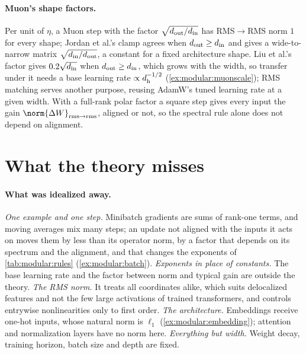\begin{refsection}
\paragraph{Muon's shape factors.} Per unit of $\eta$, a Muon step with the factor $\sqrt{d_{\mathrm{out}}/d_{\mathrm{in}}}$ has RMS$\to$RMS norm $1$ for every shape; Jordan et al.'s clamp agrees when $d_{\mathrm{out}}\ge d_{\mathrm{in}}$ and gives a wide-to-narrow matrix $\sqrt{d_{\mathrm{in}}/d_{\mathrm{out}}}$, a constant for a fixed architecture shape. Liu et al.'s factor gives $0.2\sqrt{d_{\mathrm{in}}}$ when $d_{\mathrm{out}}\ge d_{\mathrm{in}}$, which grows with the width, so transfer under it needs a base learning rate $\propto d_{\mathrm h}^{-1/2}$ (\cref{ex:modular:muonscale}); RMS matching serves another purpose, reusing AdamW's tuned learning rate at a given width. With a full-rank polar factor a square step gives every input the gain $\norm{\Delta W}_{\rms\to\rms}$, aligned or not, so the spectral rule alone does not depend on alignment.

\section{What the theory misses}\label{sec:modular:misses}

\paragraph{What was idealized away.} \emph{One example and one step.} Minibatch gradients are sums of rank-one terms, and moving averages mix many steps; an update not aligned with the inputs it acts on moves them by less than its operator norm, by a factor that depends on its spectrum and the alignment, and that changes the exponents of \cref{tab:modular:rules} (\cref{ex:modular:batch}). \emph{Exponents in place of constants.} The base learning rate and the factor between norm and typical gain are outside the theory. \emph{The RMS norm.} It treats all coordinates alike, which suits delocalized features and not the few large activations of trained transformers, and controls entrywise nonlinearities only to first order. \emph{The architecture.} Embeddings receive one-hot inputs, whose natural norm is $\ell_1$ (\cref{ex:modular:embedding}); attention and normalization layers have no norm here. \emph{Everything but width.} Weight decay, training horizon, batch size and depth are fixed.


\end{refsection}
